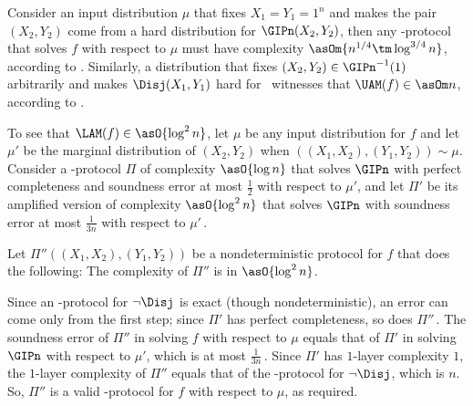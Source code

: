 

Consider an input distribution $\mu$ that fixes $X_1=Y_1=1^n$ and makes the pair $(X_2,Y_2)$ come from a hard distribution for $\GIPn(X_2,Y_2)$, then any \SBP-protocol that solves $f$ with respect to $\mu$ must have complexity $\asOm{n^{1/4}\tm\log^{3/4}n}$, according to .
%
Similarly, a distribution that fixes $(X_2,Y_2)\in\GIPn^{-1}(1)$ arbitrarily and makes $\Disj(X_1,Y_1)$ hard for \UAM\ witnesses that $\UAM(f) \in \asOm n$, according to .

To see that $\LAM(f) \in \asO{\log^2 n}$, let $\mu$ be any input distribution for $f$ and let $\mu'$ be the marginal distribution of $(X_2,Y_2)$ when $((X_1,X_2),(Y_1,Y_2))\sim\mu$.
Consider a \UAMc-protocol $\Pi$ of complexity $\asO{\log n}$ that solves $\GIPn$ with perfect completeness and soundness error at most $\frac12$ with respect to $\mu'$, and let $\Pi'$ be its amplified version of complexity $\asO{\log^2 n}$ that solves $\GIPn$ with soundness error at most $\frac1{3n}$ with respect to $\mu'$\,.

Let $\Pi''((X_1,X_2),(Y_1,Y_2))$ be a nondeterministic protocol for $f$ that does the following:
The complexity of $\Pi''$ is in $\asO{\log^2 n}$.

Since an \NP-protocol for $\lnot\Disj$ is exact (though nondeterministic), an error can come only from the first step; since $\Pi'$ has perfect completeness, so does $\Pi''$\,.
The soundness error of $\Pi''$ in solving $f$ with respect to $\mu$ equals that of $\Pi'$ in solving $\GIPn$ with respect to $\mu'$, which is at most $\frac1{3n}$\,.
Since $\Pi'$ has $1$-layer complexity $1$, the $1$-layer complexity of $\Pi''$ equals that of the \NP-protocol for $\lnot\Disj$, which is $n$.
So, $\Pi''$ is a valid \LAM-protocol for $f$ with respect to $\mu$, as required.
\prfend

